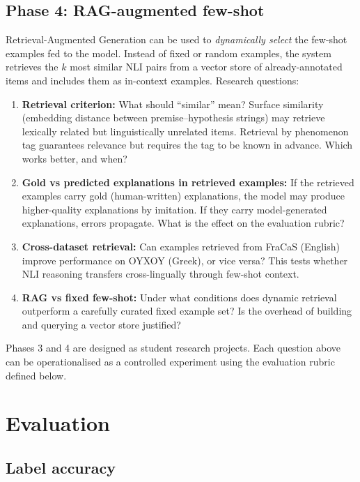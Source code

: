 \documentclass[11pt,a4paper]{article}
\begin{document}
\subsection{Phase 4: RAG-augmented few-shot}

Retrieval-Augmented Generation can be used to \emph{dynamically select} the few-shot examples fed to the model. Instead of fixed or random examples, the system retrieves the $k$ most similar NLI pairs from a vector store of already-annotated items and includes them as in-context examples. Research questions:

\begin{enumerate}[nosep,leftmargin=1.5em]
\item \textbf{Retrieval criterion:} What should ``similar'' mean? Surface similarity (embedding distance between premise--hypothesis strings) may retrieve lexically related but linguistically unrelated items. Retrieval by phenomenon tag guarantees relevance but requires the tag to be known in advance. Which works better, and when?
\item \textbf{Gold vs predicted explanations in retrieved examples:} If the retrieved examples carry gold (human-written) explanations, the model may produce higher-quality explanations by imitation. If they carry model-generated explanations, errors propagate. What is the effect on the evaluation rubric?
\item \textbf{Cross-dataset retrieval:} Can examples retrieved from FraCaS (English) improve performance on OYXOY (Greek), or vice versa? This tests whether NLI reasoning transfers cross-lingually through few-shot context.
\item \textbf{RAG vs fixed few-shot:} Under what conditions does dynamic retrieval outperform a carefully curated fixed example set? Is the overhead of building and querying a vector store justified?
\end{enumerate}

Phases 3 and 4 are designed as student research projects. Each question above can be operationalised as a controlled experiment using the evaluation rubric defined below.

\section{Evaluation}

\subsection{Label accuracy}
\end{document}
